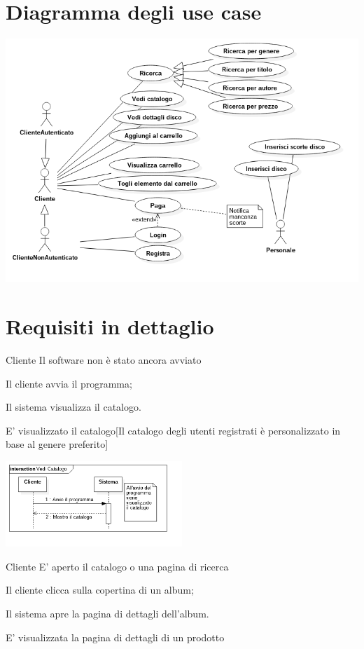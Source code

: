\section{Diagramma degli use case}

\begin{center}
    \includegraphics[width=\textwidth]{diagram/use-case.png}
\end{center}

\section{Requisiti in dettaglio}

    {Cliente}
    {Il software non è stato ancora avviato}
    {   \item Il cliente avvia il programma;
        \item Il sistema visualizza il catalogo.
    }
    {E' visualizzato il \gls{catalogo}}[Il catalogo degli utenti registrati è personalizzato in base al genere preferito]

\begin{center}
    \includegraphics[width=0.5\textwidth]{diagram/seq-uc1.png}
\end{center}
    
    {Cliente}
    {E' aperto il catalogo o una pagina di ricerca}
    {   \item Il cliente clicca sulla copertina di un album;
        \item Il sistema apre la pagina di dettagli dell'album.
    }
    {E' visualizzata la pagina di dettagli di un \gls{prodotto}}
    
